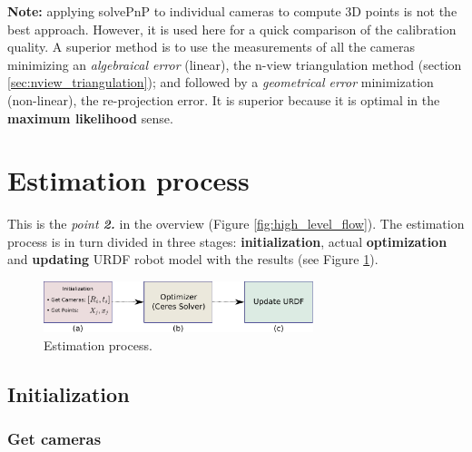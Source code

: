 \noindent
\textbf{Note:} applying solvePnP to individual cameras to compute 3D points is not the best approach. However, it is used here for a quick comparison of the calibration quality. A superior method is to use the measurements of all the cameras minimizing an \textit{algebraical error} (linear), the n-view triangulation method (section \ref{sec:nview_triangulation}); and followed by a \textit{geometrical error} minimization (non-linear), the re-projection error. It is superior because it is optimal in the \textbf{maximum likelihood} sense.

\section{Estimation process}
\label{sec:estimation}

This is the \textit{point \textbf{2.}} in the overview (Figure \ref{fig:high_level_flow}).
The estimation process is in turn divided in three stages: \textbf{initialization}, actual \textbf{optimization} and \textbf{updating} URDF robot model with the results (see Figure \ref{fig:optimization}).

\begin{figure}[!htbp]
 \centering
 \includegraphics[width=0.7\textwidth]{images/optimization.pdf}
 \caption{Estimation process.}
 \label{fig:optimization}
\end{figure}

%


\subsection{Initialization}
\label{sec:initialization}

\subsubsection*{Get cameras}

